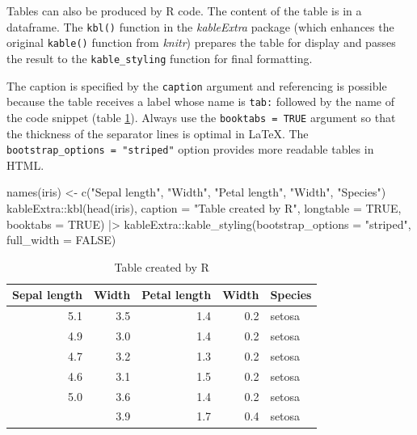 \documentclass[fleqn,]{article} %
\newenvironment{Shaded}{\begin{snugshade}}{\end{snugshade}}
\newcommand{\ConstantTok}[1]{\textcolor[rgb]{0.00,0.00,0.00}{{#1}}}
\newcommand{\SpecialCharTok}[1]{\textcolor[rgb]{0.00,0.00,0.00}{{#1}}}
\newcommand{\StringTok}[1]{\textcolor[rgb]{0.31,0.60,0.02}{{#1}}}
\newcommand{\OtherTok}[1]{\textcolor[rgb]{0.56,0.35,0.01}{{#1}}}
\newcommand{\FunctionTok}[1]{\textcolor[rgb]{0.00,0.00,0.00}{{#1}}}
\newcommand{\AttributeTok}[1]{\textcolor[rgb]{0.77,0.63,0.00}{{#1}}}
\newcommand{\NormalTok}[1]{{#1}}
\begin{document}
Tables can also be produced by R code.
The content of the table is in a dataframe.
The \texttt{kbl()} function in the \emph{kableExtra} package (which enhances the original \texttt{kable()} function from \emph{knitr}) prepares the table for display and passes the result to the \texttt{kable\_styling} function for final formatting.

The caption is specified by the \texttt{caption} argument and referencing is possible because the table receives a label whose name is \texttt{tab:} followed by the name of the code snippet (table \ref{tab:kable}).
Always use the \texttt{booktabs\ =\ TRUE} argument so that the thickness of the separator lines is optimal in LaTeX.
The \texttt{bootstrap\_options\ =\ "striped"} option provides more readable tables in HTML.

\scriptsize

\begin{Shaded}
\begin{Highlighting}[]
\FunctionTok{names}\NormalTok{(iris) }\OtherTok{\textless{}{-}} \FunctionTok{c}\NormalTok{(}\StringTok{"Sepal length"}\NormalTok{, }\StringTok{"Width"}\NormalTok{, }\StringTok{"Petal length"}\NormalTok{,}
    \StringTok{"Width"}\NormalTok{, }\StringTok{"Species"}\NormalTok{)}
\NormalTok{kableExtra}\SpecialCharTok{::}\FunctionTok{kbl}\NormalTok{(}\FunctionTok{head}\NormalTok{(iris), }\AttributeTok{caption =} \StringTok{"Table created by R"}\NormalTok{,}
    \AttributeTok{longtable =} \ConstantTok{TRUE}\NormalTok{, }\AttributeTok{booktabs =} \ConstantTok{TRUE}\NormalTok{) }\SpecialCharTok{|\textgreater{}}
\NormalTok{    kableExtra}\SpecialCharTok{::}\FunctionTok{kable\_styling}\NormalTok{(}\AttributeTok{bootstrap\_options =} \StringTok{"striped"}\NormalTok{,}
        \AttributeTok{full\_width =} \ConstantTok{FALSE}\NormalTok{)}
\end{Highlighting}
\end{Shaded}

\begin{longtable}[t]{rrrrl}
\caption{\label{tab:kable}Table created by R}\\
\toprule
Sepal length & Width & Petal length & Width & Species\\
\midrule
5.1 & 3.5 & 1.4 & 0.2 & setosa\\
4.9 & 3.0 & 1.4 & 0.2 & setosa\\
4.7 & 3.2 & 1.3 & 0.2 & setosa\\
4.6 & 3.1 & 1.5 & 0.2 & setosa\\
5.0 & 3.6 & 1.4 & 0.2 & setosa\\
\addlinespace
5.4 & 3.9 & 1.7 & 0.4 & setosa\\
\bottomrule
\end{longtable}
\end{document}
